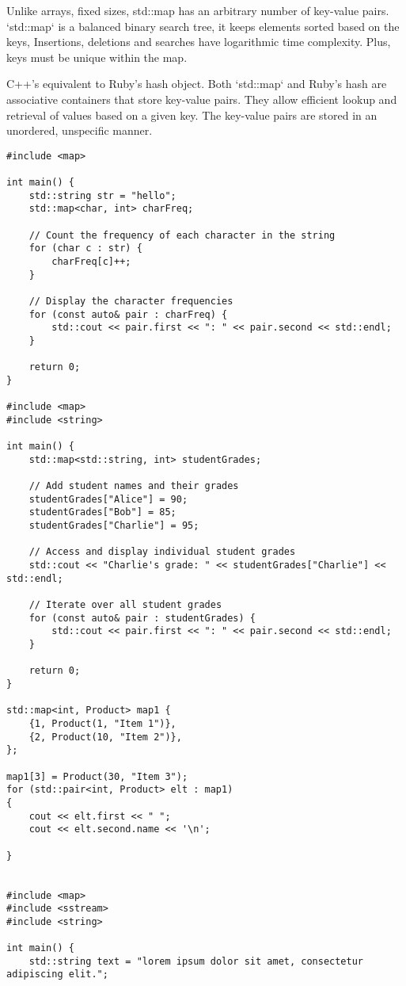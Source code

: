 Unlike arrays, fixed sizes, std::map has an arbitrary number of key-value pairs.
`std::map` is a balanced binary search tree, it keeps elements sorted based on the keys, 
Insertions, deletions and searches have logarithmic time complexity.
Plus, keys must be unique within the map.

C++'s equivalent to Ruby's hash object. 
Both `std::map` and Ruby's hash are associative containers that store key-value pairs.
They allow efficient lookup and retrieval of values based on a given key.
The key-value pairs are stored in an unordered, unspecific manner.

\begin{verbatim}
#include <map>

int main() {
    std::string str = "hello";
    std::map<char, int> charFreq;

    // Count the frequency of each character in the string
    for (char c : str) {
        charFreq[c]++;
    }

    // Display the character frequencies
    for (const auto& pair : charFreq) {
        std::cout << pair.first << ": " << pair.second << std::endl;
    }

    return 0;
}

#include <map>
#include <string>

int main() {
    std::map<std::string, int> studentGrades;

    // Add student names and their grades
    studentGrades["Alice"] = 90;
    studentGrades["Bob"] = 85;
    studentGrades["Charlie"] = 95;

    // Access and display individual student grades
    std::cout << "Charlie's grade: " << studentGrades["Charlie"] << std::endl;

    // Iterate over all student grades
    for (const auto& pair : studentGrades) {
        std::cout << pair.first << ": " << pair.second << std::endl;
    }

    return 0;
}

std::map<int, Product> map1 {
    {1, Product(1, "Item 1")},
    {2, Product(10, "Item 2")},
};

map1[3] = Product(30, "Item 3");
for (std::pair<int, Product> elt : map1)
{
    cout << elt.first << " ";
    cout << elt.second.name << '\n';

}


#include <map>
#include <sstream>
#include <string>

int main() {
    std::string text = "lorem ipsum dolor sit amet, consectetur adipiscing elit.";


\end{verbatim}
